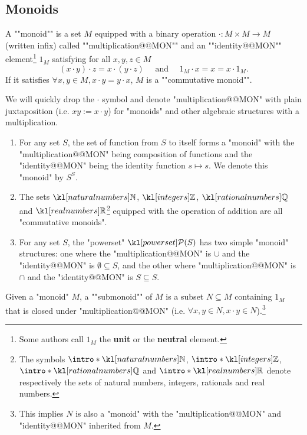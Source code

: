 \documentclass[main.tex]{subfiles}
\begin{document}
\subsection{Monoids}
\begin{defn}[Monoid]
    \AP A ""monoid"" is a set $M$ equipped with a binary operation $\cdot: M\times M \rightarrow M$ (written infix) called ""multiplication@@MON"" and an ""identity@@MON"" element\footnote{Some authors call $1_M$ the \textbf{unit} or the \textbf{neutral} element.} $1_M$ satisfying for all $x,y,z \in M$
    \[(x\cdot y) \cdot z = x \cdot (y\cdot z) \quad \text{ and } \quad 1_M \cdot x = x = x \cdot 1_M.\]
    \AP If it satisfies $\forall x,y \in M, x\cdot y = y \cdot x$, $M$ is a ""commutative monoid"".
\end{defn}
\begin{rem}
    We will quickly drop the $\cdot$ symbol and denote "multiplication@@MON" with plain juxtaposition (i.e. $xy:= x\cdot y$) for "monoids" and other algebraic structures with a multiplication.
\end{rem}
\begin{exmps}
    \begin{enumerate}
        \item For any set $S$, the set of function from $S$ to itself forms a "monoid" with the "multiplication@@MON" being composition of functions and the "identity@@MON" being the identity function $s \mapsto s$. We denote this "monoid" by $S^S$.
        \item The sets $\N$, $\Z$, $\Q$ and $\R$\footnote{\AP The symbols $\intro*\N$, $\intro*\Z$, $\intro*\Q$ and $\intro*\R$ denote respectively the sets of natural numbers, integers, rationals and real numbers.} equipped with the operation of addition are all "commutative monoids".
        \item For any set $S$, the "powerset" $\mP(S)$ has two simple "monoid" structures: one where the "multiplication@@MON" is $\cup$ and the "identity@@MON" is $\emptyset\subseteq S$, and the other where "multiplication@@MON" is $\cap$ and the "identity@@MON" is $S\subseteq S$.
    \end{enumerate}
\end{exmps}
\begin{defn}[Submonoid]
    \AP Given a "monoid" $M$, a ""submonoid"" of $M$ is a subset $N\subseteq M$ containing $1_M$ that is closed under "multiplication@@MON" (i.e. $\forall x,y \in N, x\cdot y \in N$).\footnote{This implies $N$ is also a "monoid" with the "multiplication@@MON" and "identity@@MON" inherited from $M$.}
\end{defn}
\end{document}
